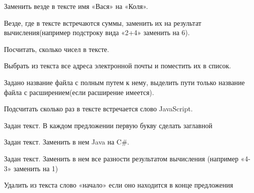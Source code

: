 \task Заменить везде в тексте имя «Вася» на «Коля».

\task Везде, где в тексте встречаются суммы, заменить их на результат
вычисления(например подстроку вида «2+4» заменить на 6).

\task Посчитать, сколько чисел в тексте.

\task Выбрать из текста все адреса электронной почты и поместить их в
список.

\task Задано название файла с полным путем к нему, выделить пути
только название файла с расширением(если расширение имеется).

\task Подсчитать сколько раз в тексте встречается слово JavaScript.

\task Задан текст. В каждом предложении первую букву сделать заглавной

\task Задан текст. Заменить в нем Java на C\#.

\task Задан текст. Заменить в нем все разности результатом вычисления
(например «4-3» заменить на 1)

\task Удалить из текста слово «начало» если оно находится в конце
предложения


